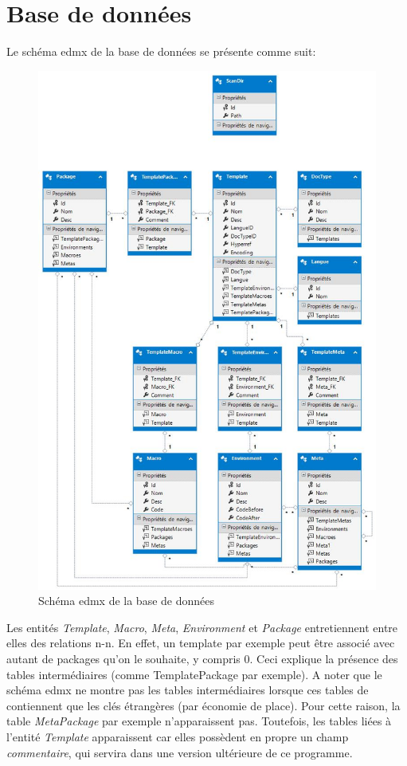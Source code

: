 \documentclass[a4paper, oneside]{article}
\begin{document}
\section{Base de données}
\label{sec:org2f403bc}
Le schéma edmx de la base de données se présente comme suit:
\begin{figure}[htbp]
\centering
\includegraphics[width=.9\linewidth]{../Images/EntityDesignerDiagram.jpg}
\caption{\label{fig:orgbed741a}
Schéma edmx de la base de données}
\end{figure}

Les entités \emph{Template}, \emph{Macro}, \emph{Meta}, \emph{Environment} et \emph{Package}
entretiennent entre elles des relations n-n. En effet, un template par
exemple peut être associé avec autant de packages qu'on le souhaite, y
compris 0. Ceci explique la présence des tables intermédiaires (comme
TemplatePackage par exemple). A noter que le schéma edmx ne montre pas
les tables intermédiaires lorsque ces tables de contiennent que les
clés étrangères (par économie de place). Pour cette raison, la table
\emph{MetaPackage} par exemple n'apparaissent pas. Toutefois, les tables
liées à l'entité \emph{Template} apparaissent car elles possèdent en propre
un champ \emph{commentaire}, qui servira dans une version ultérieure de ce
programme.
\end{document}
